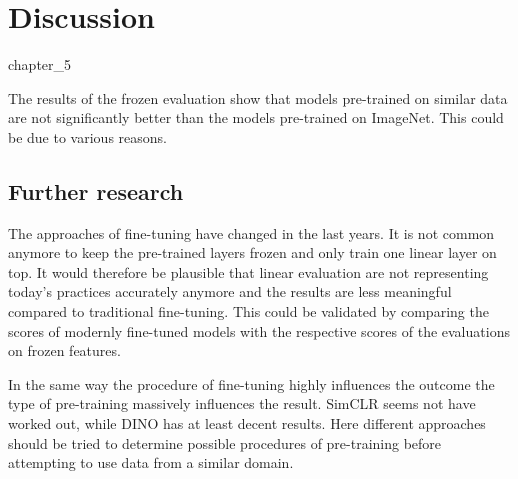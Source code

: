 \chapter{Discussion}{chapter_5}

The results of the frozen evaluation show that models pre-trained on similar data are not significantly better than the models pre-trained on ImageNet. 
This could be due to various reasons.

\section{Further research}
The approaches of fine-tuning have changed in the last years. It is not common anymore to keep the pre-trained layers frozen and only train one linear layer on top. 
It would therefore be plausible that linear evaluation are not representing today's practices accurately anymore and the results are less meaningful compared to traditional fine-tuning.
This could be validated by comparing the scores of modernly fine-tuned models with the respective scores of the evaluations on frozen features.

In the same way the procedure of fine-tuning highly influences the outcome the type of pre-training massively influences the result. SimCLR seems not have worked out, while DINO has at least decent results. 
Here different approaches should be tried to determine possible procedures of pre-training before attempting to use data from a similar domain.


















